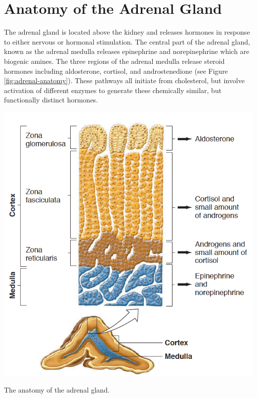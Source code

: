 \documentclass{tufte-handout}
\begin{document}
\pagebreak

\section{Anatomy of the Adrenal Gland}

The adrenal gland is located above the kidney and releases hormones in response to either nervous or hormonal stimulation.  The central part of the adrenal gland, known as the adrenal medulla releases epinephrine and norepinephrine which are biogenic amines.  The three regions of the adrenal medulla release steroid hormones including aldosterone, cortisol, and androstenedione (see Figure \ref{fig:adrenal-anatomy}).  These pathways all initiate from cholesterol, but involve activation of different enzymes to generate these chemically similar, but functionally distinct hormones.

\begin{marginfigure}
  \includegraphics{figures/adrenal-anatomy}
  \caption{The anatomy of the adrenal gland.}
    \label{fig:adrenal-anatomy}
\end{marginfigure}
\end{document}
